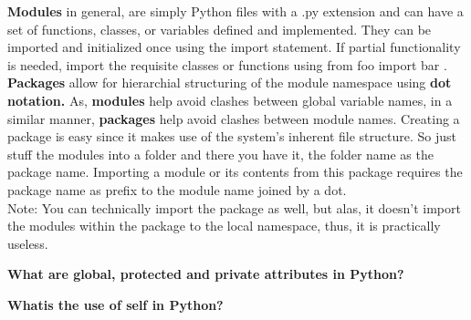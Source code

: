 {{\textbf{Modules} in general, are simply Python files with a .py extension and can have a set of
functions, classes, or variables defined and implemented. They can be imported and
initialized once using the import statement. If partial functionality is needed,
import the requisite classes or functions using from foo import bar . 
\\
\textbf{Packages} allow for hierarchial structuring of the module namespace using \textbf{ dot
notation.} As, \textbf{modules} help avoid clashes between global variable names, in a similar
manner, \textbf{packages} help avoid clashes between module names.
Creating a package is easy since it makes use of the system's inherent file structure.
So just stuff the modules into a folder and there you have it, the folder name as the
package name. Importing a module or its contents from this package requires the
package name as prefix to the module name joined by a dot. \\
Note: You can technically import the package as well, but alas, it doesn't import the
modules within the package to the local namespace, thus, it is practically useless.
         }
         
     \item \textbf{What are global, protected and private attributes in Python?}
     
     
     
     \item \textbf{Whatis the use of self in Python?}
     

}
